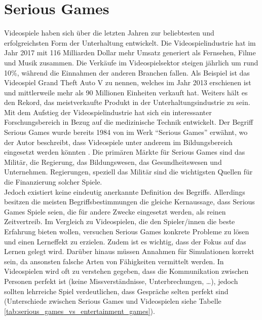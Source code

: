 \section{Serious Games}
Videospiele haben sich über die letzten Jahren zur beliebtesten und erfolgreichsten Form der Unterhaltung entwickelt. Die Videospielindustrie hat im Jahr 2017 mit 116 Milliarden Dollar mehr Umsatz generiert als Fernsehen, Filme und Musik zusammen. Die Verkäufe im Videospielsektor steigen jährlich um rund 10\%, während die Einnahmen der anderen Branchen fallen. Als Beispiel ist das Videospiel Grand Theft Auto V zu nennen, welches im Jahr 2013 erschienen ist und mittlerweile mehr als 90 Millionen Einheiten verkauft hat. Weiters hält es den Rekord, das meistverkaufte Produkt in der Unterhaltungsindustrie zu sein. \cite{reuters:2018:gaming} \\ 
Mit dem Aufstieg der Videospielindustrie hat sich ein interessanter Forschungsbereich in Bezug auf die medizinische Technik entwickelt. Der Begriff Serious Games wurde bereits 1984 von \citeauthor{c_abt:1987:serious_games} im Werk \enquote{Serious Games} erwähnt, wo der Autor beschreibt, dass Videospiele unter anderem im Bildungsbereich eingesetzt werden könnten \cite{c_abt:1987:serious_games}.
Die primären Märkte für Serious Games sind das Militär, die Regierung, das Bildungswesen, das Gesundheitswesen und Unternehmen. Regierungen, speziell das Militär sind die wichtigsten Quellen für die Finanzierung solcher Spiele. \cite{michael:2006:educate} \\
Jedoch existiert keine eindeutig anerkannte Definition des Begriffs. Allerdings besitzen die meisten Begriffsbestimmungen die gleiche Kernaussage, dass Serious Games Spiele seien, die für andere Zwecke eingesetzt werden, als reinen Zeitvertreib. Im Vergleich zu Videospielen, die den Spieler/innen die beste Erfahrung bieten wollen, versuchen Serious Games konkrete Probleme zu lösen und einen Lerneffekt zu erzielen. Zudem ist es wichtig, dass der Fokus auf das Lernen gelegt wird. Darüber hinaus müssen Annahmen für Simulationen korrekt sein, da ansonsten falsche Arten von Fähigkeiten vermittelt werden. In Videospielen wird oft zu verstehen gegeben, dass die Kommunikation zwischen Personen perfekt ist (keine Missverständnisse, Unterbrechungen, \dots), jedoch sollten lehrreiche Spiel verdeutlichen, dass Gespräche selten perfekt sind (Unterschiede zwischen Serious Games und Videospielen siehe Tabelle \ref{tab:serious_games_vs_entertainment_games}). \cite{serious_games:2007:an_overview}

